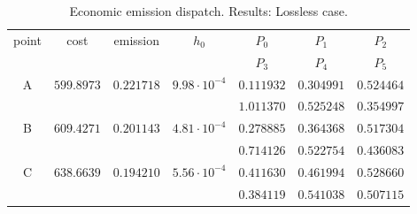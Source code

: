 \begin{table} \centering
\caption{Economic emission dispatch. Results: Lossless case.}
\scriptsize \setlength{\tabcolsep}{0.5em}
\begin{tabular}[c]{ccccccc} \toprule
point & cost & emission & $h_0$  &  $P_0$ & $P_1$ & $P_2$ \\
      &      &          &        &  $P_3$ & $P_4$ & $P_5$ \\ \hline
A & $599.8973$ & $0.221718$ & $9.98\cdot 10^{-4}$  &  $0.111932$ & $0.304991$ & $0.524464$ \\
   &        &        &       &  $1.011370$ & $0.525248$ & $0.354997$ \\
B & $609.4271$ & $0.201143$ & $4.81\cdot 10^{-4}$  &  $0.278885$ & $0.364368$ & $0.517304$ \\
   &        &        &       &  $0.714126$ & $0.522754$ & $0.436083$ \\
C & $638.6639$ & $0.194210$ & $5.56\cdot 10^{-4}$  &  $0.411630$ & $0.461994$ & $0.528660$ \\
   &        &        &       &  $0.384119$ & $0.541038$ & $0.507115$ \\

\bottomrule
\end{tabular}
\label{tab:eedLossless}
\end{table}
